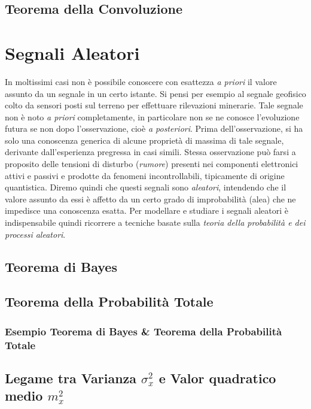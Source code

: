\documentclass[12pt,oneside,openany]{memoir}
\numberwithin{equation}{subsection}
\begin{document}
\newpage
\subsection{Teorema della Convoluzione}

\newpage	
\section{Segnali Aleatori}
In moltissimi casi non \`e possibile conoscere con esattezza \textit{a priori} il valore assunto da un segnale in un certo istante. Si pensi per esempio al segnale geofisico colto da sensori posti sul terreno per effettuare rilevazioni minerarie. Tale segnale non \`e noto \textit{a priori} completamente, in particolare non se ne conosce l'evoluzione futura se non dopo l'osservazione, cio\`e \textit{a posteriori}. Prima dell'osservazione, si ha solo una conoscenza generica di alcune propriet\`a di massima di tale segnale, derivante dall'esperienza pregressa in casi simili. Stessa osservazione pu\`o farsi a proposito delle tensioni di disturbo (\textit{rumore}) presenti nei componenti elettronici attivi e passivi e prodotte da fenomeni incontrollabili, tipicamente di origine quantistica. Diremo quindi che questi segnali sono \textit{aleatori}, intendendo che il valore assunto da essi \`e affetto da un certo grado di improbabilit\`a (alea) che ne impedisce una conoscenza esatta. 
Per modellare e studiare i segnali aleatori \`e indispensabile quindi ricorrere a tecniche basate sulla \textit{teoria della probabilit\`a e dei processi aleatori}.

\newpage
\subsection{Teorema di Bayes}

\newpage
\subsection{Teorema della Probabilit\`a Totale}

\newpage
\subsubsection{Esempio Teorema di Bayes \& Teorema della Probabilit\`a Totale}

\newpage
\subsection{Legame tra Varianza $\sigma_x^2$ e Valor quadratico medio $m_x^2$}
\end{document}
